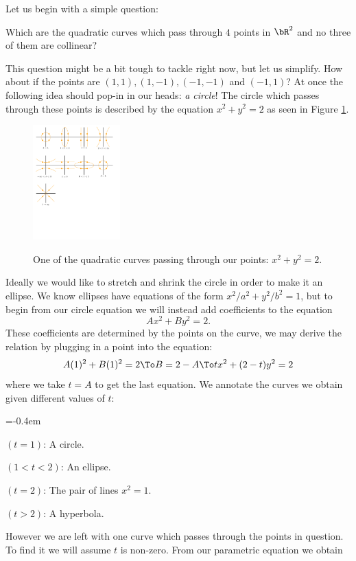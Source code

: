 \documentclass[12pt]{memoir}
\begin{document}
Let us begin with a simple question:
\begin{significant}
Which are the quadratic curves which pass through $4$ points in $\bR^2$ and no three of them are collinear?
\end{significant}
This question might be a bit tough to tackle right now, but let us simplify. How about if the points are $(1,1),(1,-1),(-1,-1)$ and $(-1,1)$? At once the following idea should pop-in in our heads: \emph{a circle}! The circle which passes through these points is described by the equation $x^2+y^2=2$ as seen in Figure \ref{fig1}.
\begin{figure}[h!]
    \centering
    \includegraphics[width=0.3\textwidth, trim= 0.8cm 22.9cm 16cm 0.6cm,clip]{fig1.pdf}
    \label{fig1}
    \caption{One of the quadratic curves passing through our points: $x^2+y^2=2$.}
\end{figure}
Ideally we would like to stretch and shrink the circle in order to make it an ellipse. We know ellipses have equations of the form $x^2/a^2+y^2/b^2=1$, but to begin from our circle equation we will instead add coefficients to the equation 
$$Ax^2+By^2=2.$$
These coefficients are determined by the points on the curve, we may derive the relation by plugging in a point into the equation:
$$A(1)^2+B(1)^2=2\To B=2-A\To tx^2+(2-t)y^2=2$$
where we take $t=A$ to get the last equation.
We annotate the curves we obtain given different values of $t$:
\vspace{-0.5em}
\begin{itemize}
    \begin{multicols}{2}
        \itemsep=-0.4em
    \item $(t=1)$: A circle.
    \item $(1<t<2)$: An ellipse.
    \item $(t=2)$: The pair of lines $x^2=1$.
    \item $(t>2)$: A hyperbola.
    \end{multicols}
\end{itemize}
However we are left with one curve which passes through the points in question. To find it we will assume $t$ is non-zero. From our parametric equation we obtain 
\end{document}
